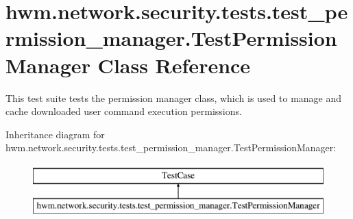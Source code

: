\hypertarget{classhwm_1_1network_1_1security_1_1tests_1_1test__permission__manager_1_1_test_permission_manager}{\section{hwm.\-network.\-security.\-tests.\-test\-\_\-permission\-\_\-manager.\-Test\-Permission\-Manager Class Reference}
\label{classhwm_1_1network_1_1security_1_1tests_1_1test__permission__manager_1_1_test_permission_manager}
}


This test suite tests the permission manager class, which is used to manage and cache downloaded user command execution permissions.  


Inheritance diagram for hwm.\-network.\-security.\-tests.\-test\-\_\-permission\-\_\-manager.\-Test\-Permission\-Manager\-:\begin{figure}[H]
\begin{center}
\leavevmode
\includegraphics[height=2.000000cm]{classhwm_1_1network_1_1security_1_1tests_1_1test__permission__manager_1_1_test_permission_manager}
\end{center}
\end{figure}
